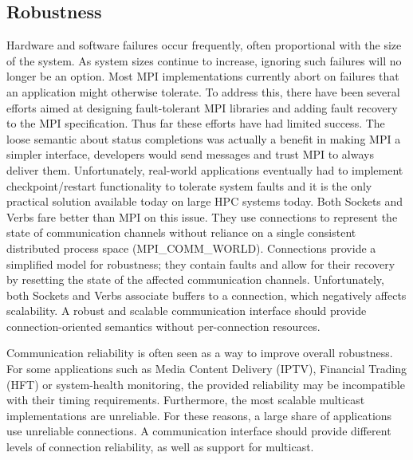 \subsection{Robustness}
Hardware and software failures occur frequently, often proportional with the size of the system. 
As system sizes continue to increase, ignoring such failures will no longer be an option. 
Most MPI implementations currently abort on failures that an application might otherwise tolerate. 
To address this, there have been several efforts aimed at designing fault-tolerant MPI libraries and adding fault recovery 
to the MPI specification. Thus far these efforts have had limited success. The loose semantic about 
status completions was actually a benefit in making MPI a simpler interface, 
developers would send messages and trust MPI to always deliver them. 
Unfortunately, real-world applications eventually had to implement 
checkpoint/restart functionality to tolerate system faults and it is the 
only practical solution available today on large HPC systems today. 
Both Sockets and Verbs fare better than MPI on this issue. They use connections 
to represent the state of communication channels without reliance on a single consistent 
distributed process space ({\sf MPI\_COMM\_WORLD}). Connections provide a simplified 
model for robustness; they contain faults and allow for their recovery by resetting 
the state of the affected communication channels. 
Unfortunately, both Sockets and Verbs associate buffers to a connection, which 
negatively affects scalability. A robust and scalable communication interface should provide 
connection-oriented semantics without per-connection resources. 

Communication reliability is often seen as a way to improve overall robustness. 
For some applications such as Media Content Delivery (IPTV), Financial Trading 
(HFT) or system-health monitoring, the provided reliability may be incompatible 
with their timing requirements. 
Furthermore, the most scalable multicast implementations are unreliable. For these 
reasons, a large share of applications use unreliable connections. 
A communication interface should provide different levels of connection 
reliability, as well as support for multicast. 


